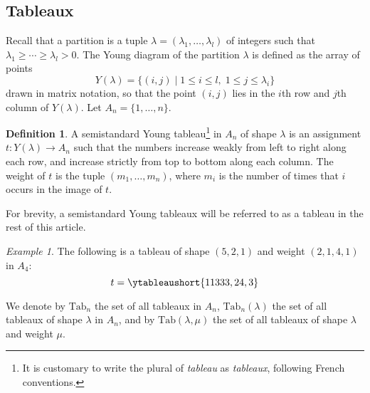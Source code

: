 \documentclass[10pt]{amsproc}
\theoremstyle{definition}
\newtheorem{definition}[theorem]{Definition}
\theoremstyle{remark}
\newtheorem{example}[theorem]{Example}
\newcommand{\Tab}{\mathrm{Tab}}
\begin{document}
\subsection{Tableaux}
\label{sec:tableaux}
Recall that a partition is a tuple $\lambda=(\lambda_1,\dotsc,\lambda_l)$ of integers such that $\lambda_1\geq \dotsb\geq \lambda_l>0$.
The Young diagram of the partition $\lambda$ is defined as the array of points
\begin{displaymath}
Y(\lambda)=\{(i,j)\mid 1\leq i\leq l,\;1\leq j\leq \lambda_i\}
\end{displaymath}
drawn in matrix notation, so that the point $(i,j)$ lies in the $i$th row and $j$th column of $Y(\lambda)$.
Let $A_n=\{1,\dotsc,n\}$.
\begin{definition}
  A semistandard Young tableau\footnote{It is customary to write the plural of \emph{tableau} as \emph{tableaux}, following French conventions.} in $A_n$ of shape $\lambda$ is an assignment $t:Y(\lambda)\to A_n$ such that the numbers increase weakly from left to right along each row, and increase strictly from top to bottom along each column.
  The weight of $t$ is the tuple $(m_1,\dotsc, m_n)$, where $m_i$ is the number of times that $i$ occurs in the image of $t$.
\end{definition}
For brevity, a semistandard Young tableaux will be referred to as a tableau in the rest of this article.
\begin{example}
  \label{example:ssyt}
  The following is a tableau of shape $(5,2,1)$ and weight $(2,1,4,1)$ in $A_4$:
  \begin{displaymath}
    t=\ytableaushort{11333,24,3}
  \end{displaymath}
\end{example}
We denote by $\Tab_n$ the set of all tableaux in $A_n$, $\Tab_n(\lambda)$ the set of all tableaux of shape $\lambda$ in $A_n$, and by $\Tab(\lambda,\mu)$ the set of all tableaux of shape $\lambda$ and weight $\mu$.
\end{document}
